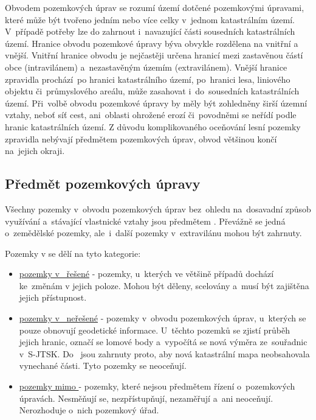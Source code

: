 Obvodem pozemkových úprav se rozumí území dotčené pozemkovými úpravami, které může být tvořeno jedním nebo více celky v~jednom katastrálním území. V~případě potřeby lze do  zahrnout i~navazující části sousedních katastrálních území. Hranice obvodu pozemkové úpravy býva obvykle rozdělena na vnitřní a vnější. Vnitřní hranice obvodu je nejčastěji určena hranicí mezi zastavěnou částí obce (intravilánem) a~nezastavěným územím (extravilánem). Vnější hranice zpravidla prochází~po hranici katastrálního území, po~hranici lesa, liniového objektu či~průmy\-slového areálu, může zasahovat i~do~sousedních katastrálních území. Při~volbě obvodu pozemkové úpravy by měly být zohledněny širší územní vztahy, neboť síť cest, ani~oblasti ohrožené erozí či~povodněmi se neřídí podle hranic katastrálních území. Z důvodu komplikovaného oceňování lesní pozemky zpravidla nebývají předmětem pozemkových úprav, obvod většinou končí na~jejich okraji.

\subsection{Předmět pozemkových úpravy}
\label{predmet_pu}

Všechny pozemky v~obvodu pozemkových úprav bez~ohledu na~dosavadní způsob využívání a~stávající vlastnické vztahy jsou předmětem . Převážně se jedná o~zemědělské pozemky, ale~i~další pozemky v~extravilánu mohou být zahrnuty.

Pozemky v  se dělí na tyto kategorie:
	\begin{itemize}[leftmargin=1.5cm, noitemsep]
		\item \underline{pozemky v~ řešené} - pozemky, u~kte\-rých ve většině případů dochází ke~změnám v jejich poloze. Mohou být děleny, scelovány a~musí být zajištěna jejich přístupnost.
		\item \underline{pozemky v~ neřešené} - pozemky v~obvodu pozemkových úprav, u~kterých se pouze obnovují geodetické informace. U~těchto pozemků se zjistí průběh jejich hranic, označí se lomové body a~vypočítá se nová výměra ze~souřadnic v~S-JTSK. Do~ jsou zahrnuty proto, aby nová katastrální mapa neobsahovala vynechané části. Tyto pozemky se neoceňují.
		\item \underline{pozemky mimo } - pozemky, které nejsou předmětem řízení o~pozemko\-vých úpravách. Nesměňují se, nezpřístupňují, nezaměřují a~ani neoceňují. Nerozhoduje o~nich pozemkový úřad.
	\end{itemize}

